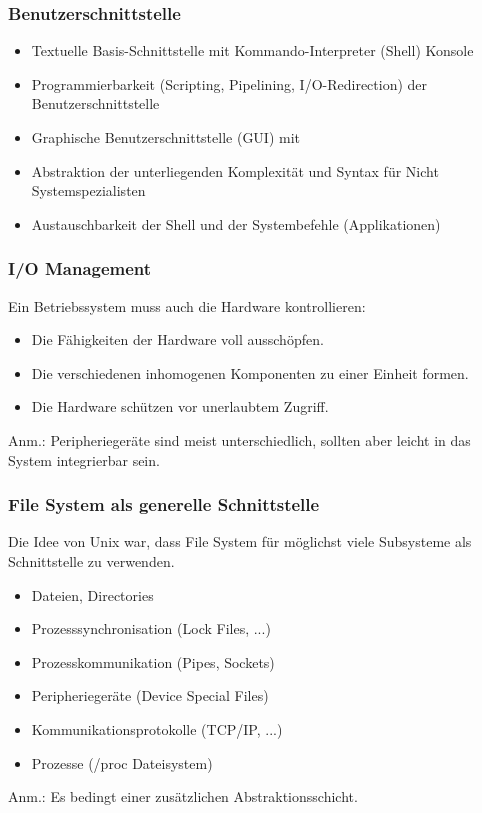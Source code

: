 \documentclass[a4paper, 10pt]{article}
\begin{document}
\subsubsection{Benutzerschnittstelle}
\begin{itemize}
\item Textuelle Basis-Schnittstelle mit Kommando-Interpreter (Shell) Konsole
\item Programmierbarkeit (Scripting, Pipelining, I/O-Redirection) der Benutzerschnittstelle
\item Graphische Benutzerschnittstelle (GUI) mit
\item Abstraktion der unterliegenden Komplexit\"at und Syntax f\"ur Nicht Systemspezialisten
\item Austauschbarkeit der Shell und der Systembefehle (Applikationen)
\end{itemize}


\subsubsection{I/O Management}
Ein Betriebssystem muss auch die Hardware kontrollieren:
\begin{itemize}
\item Die F\"ahigkeiten der Hardware voll aussch\"opfen.
\item Die verschiedenen inhomogenen Komponenten zu einer Einheit formen.
\item Die Hardware sch\"utzen vor unerlaubtem Zugriff.
\end{itemize}
Anm.: Peripherieger\"ate sind meist unterschiedlich, sollten aber leicht in das System integrierbar sein.

\subsubsection{File System als generelle Schnittstelle}
Die Idee von Unix war, dass File System f\"ur m\"oglichst viele Subsysteme als Schnittstelle zu verwenden.
\begin{itemize}
\item Dateien, Directories
\item Prozesssynchronisation (Lock Files, ...)
\item Prozesskommunikation (Pipes, Sockets)
\item Peripherieger\"ate (Device Special Files)
\item Kommunikationsprotokolle (TCP/IP, ...)
\item Prozesse (/proc Dateisystem)
\end{itemize}
Anm.: Es bedingt einer zus\"atzlichen Abstraktionsschicht.
\end{document}

